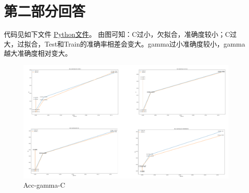 \documentclass[a4paper,11pt,onecolumn,oneside,UTF8]{article}
\begin{document}
\section*{第二部分回答}

代码见如下文件
\href{https://github.com/Allenem/PatternRecognition/blob/main/hw6/hw6.py}{Python文件}。
由图可知：C过小，欠拟合，准确度较小；C过大，过拟合，Test和Train的准确率相差会变大。gamma过小准确度较小，gamma越大准确度相对变大。\\
\begin{figure}[H]
    \centering
    \includegraphics[width=\textwidth]{hw6.png}
    \caption{ Acc-gamma-C }
    \label{img1}
\end{figure}
\end{document}

